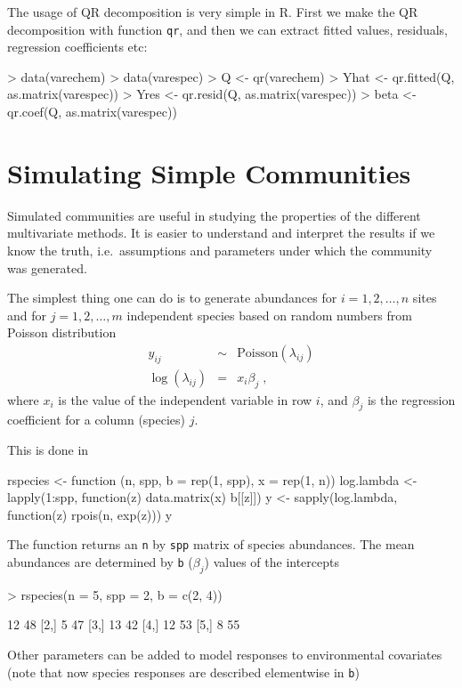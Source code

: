 The usage of QR decomposition is very simple in R. First we make the QR decomposition with function \texttt{qr}, and then we can extract fitted values, residuals, regression coefficients etc:

\begin{Schunk}
\begin{Sinput}
> data(varechem)
> data(varespec)
> Q <- qr(varechem)
> Yhat <- qr.fitted(Q, as.matrix(varespec))
> Yres <- qr.resid(Q, as.matrix(varespec))
> beta <- qr.coef(Q, as.matrix(varespec))
\end{Sinput}
\end{Schunk}

\section{Simulating Simple Communities}

Simulated communities are useful in studying the properties of the
different multivariate methods. It is easier to understand and interpret
the results if we know the truth,
i.e.~assumptions and parameters under which the community was generated.

The simplest thing one can do is to generate abundances for $i = 1,2,\ldots,n$
sites and for $j = 1,2,\ldots,m$ independent species based on random
numbers from Poisson distribution
\begin{eqnarray}
  y_{ij} &\sim &\mathrm{Poisson}(\lambda_{ij})\\
  \log(\lambda_{ij}) &=& x_i \beta_j\;,
\end{eqnarray}
where $x_i$ is the value of the independent variable in row $i$, and
$\beta_j$ is the regression coefficient for a column (species) $j$.

This is done in
\begin{Schunk}
\begin{Soutput}
rspecies <-
function (n, spp, b = rep(1, spp), x = rep(1, n)) 
{
    log.lambda <- lapply(1:spp, function(z) data.matrix(x) %*% 
        b[[z]])
    y <- sapply(log.lambda, function(z) rpois(n, exp(z)))
    y
}
\end{Soutput}
\end{Schunk}
The function returns an \texttt{n} by \texttt{spp} matrix of species abundances.
The mean abundances are determined by \texttt{b} ($\beta_j$) values of the intercepts

\begin{Schunk}
\begin{Sinput}
> rspecies(n = 5, spp = 2, b = c(2, 4))
\end{Sinput}
\begin{Soutput}
     [,1] [,2]
[1,]   12   48
[2,]    5   47
[3,]   13   42
[4,]   12   53
[5,]    8   55
\end{Soutput}
\end{Schunk}
Other parameters can be added to model responses to environmental covariates
(note that now species responses are described elementwise in \texttt{b})

